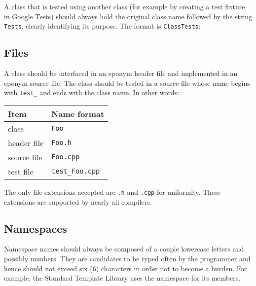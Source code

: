   
A class that is tested using another class (for example by creating a test 
fixture in Google Tests) should always hold the original class name followed by 
the string \texttt{Tests}, clearly identifying its purpose. The format is 
\texttt{ClassTests}:

  
\subsection{Files}

A class should be interfaced in an eponym header file and implemented in an 
eponym source file. The class should be tested in a source file whose 
name begins with \texttt{test\_} and ends with the class name. In other words:

\begin{center}
  \begin{tabular}{|l|l|}
    \hline
    \textbf{Item}  & \textbf{Name format}  \\
    \hline\hline
    class          & \texttt{Foo}          \\
    header file    & \texttt{Foo.h}        \\
    source file    & \texttt{Foo.cpp}      \\
    test file      & \texttt{test\_Foo.cpp} \\
    \hline
  \end{tabular} 
\end{center}

\clearpage


The only file extensions accepted are \texttt{.h} and \texttt{.cpp} for 
uniformity. These extensions are supported by nearly all compilers.

\clearpage

\subsection{Namespaces}

Namespace names should always be composed of a couple lowercase letters and 
possibly numbers. They are candidates to be typed often by the programmer 
and hence should not exceed six (6) characters in order not to become a burden. 
For example, the Standard Template Library uses the namespace  for 
its members.

